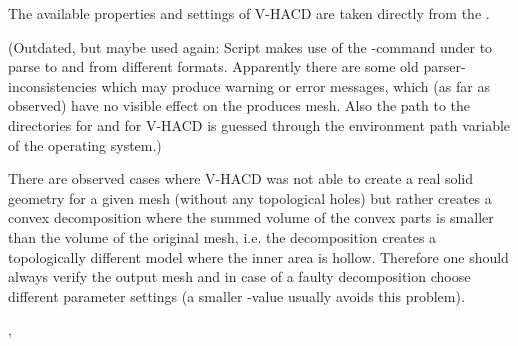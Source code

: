 \documentclass[letterpaper,10pt,english]{sphinxmanual}
\begin{document}
The available properties and settings of V-HACD are taken directly from the .

(Outdated, but maybe used again: Script makes use of the -command under  to parse to and from different formats. Apparently there are some old parser-inconsistencies which may produce warning or error messages, which (as far as observed) have no visible effect on the produces mesh. Also the path to the directories  for  and  for V-HACD is guessed through the environment path variable of the operating system.)

 There are observed cases where V-HACD was not able to create a real solid geometry for a given mesh (without any topological holes) but rather creates a convex decomposition where the summed volume of the convex parts is smaller than the volume of the original mesh, i.e. the decomposition creates a topologically different model where the inner area is hollow. Therefore one should always verify the output mesh and in case of a faulty decomposition choose different parameter settings (a smaller -value usually avoids this problem).

 {\hyperref[\detokenize{pk_src.getVolume:getvolume}]{}}, {\hyperref[\detokenize{pk_src.intersection:intersection}]{}}
\end{document}
